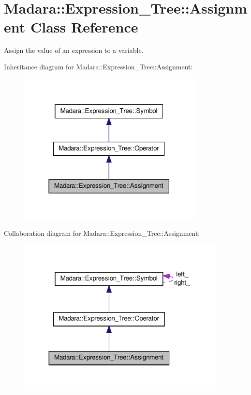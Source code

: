 \hypertarget{classMadara_1_1Expression__Tree_1_1Assignment}{
\section{Madara::Expression\_\-Tree::Assignment Class Reference}
\label{d9/de4/classMadara_1_1Expression__Tree_1_1Assignment}
}


Assign the value of an expression to a variable.  




Inheritance diagram for Madara::Expression\_\-Tree::Assignment:
\nopagebreak
\begin{figure}[H]
\begin{center}
\leavevmode
\includegraphics[width=266pt]{d7/d27/classMadara_1_1Expression__Tree_1_1Assignment__inherit__graph}
\end{center}
\end{figure}


Collaboration diagram for Madara::Expression\_\-Tree::Assignment:
\nopagebreak
\begin{figure}[H]
\begin{center}
\leavevmode
\includegraphics[width=299pt]{de/ddc/classMadara_1_1Expression__Tree_1_1Assignment__coll__graph}
\end{center}
\end{figure}
